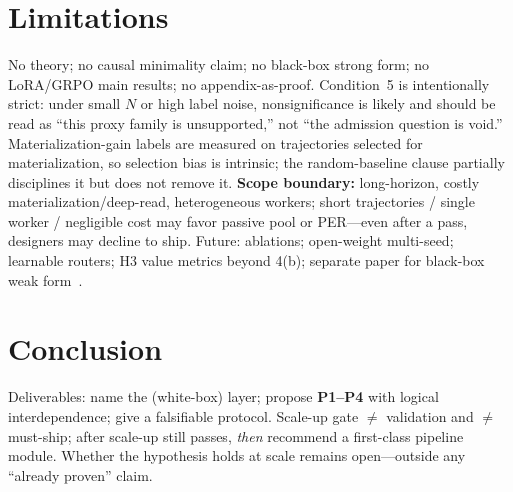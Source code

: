 \documentclass{article}
\begin{document}
\section{Limitations}
\label{sec:limits}

No theory; no causal minimality claim; no black-box strong form; no LoRA/GRPO main results; no appendix-as-proof. Condition~5 is intentionally strict: under small \(N\) or high label noise, nonsignificance is likely and should be read as ``this proxy family is unsupported,'' not ``the admission question is void.'' Materialization-gain labels are measured on trajectories selected for materialization, so selection bias is intrinsic; the random-baseline clause partially disciplines it but does not remove it. \textbf{Scope boundary:} long-horizon, costly materialization/deep-read, heterogeneous workers; short trajectories / single worker / negligible cost may favor passive pool or PER---even after a pass, designers may decline to ship. Future: ablations; open-weight multi-seed; learnable routers; H3 value metrics beyond 4(b); separate paper for black-box weak form~\citep{shen2024alignment,pathak2017curiosity,burda2019exploration}.

\section{Conclusion}
\label{sec:conclusion}

Deliverables: name the (white-box) layer; propose \textbf{P1--P4} with logical interdependence; give a falsifiable protocol. Scale-up gate \(\neq\) validation and \(\neq\) must-ship; after scale-up still passes, \emph{then} recommend a first-class pipeline module. Whether the hypothesis holds at scale remains open---outside any ``already proven'' claim.



\end{document}
